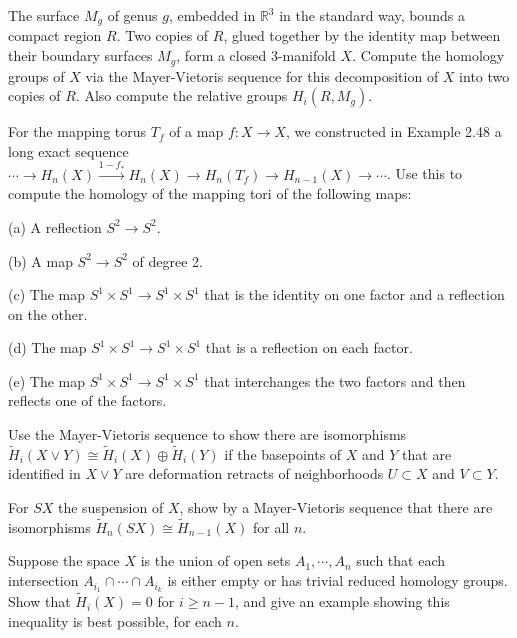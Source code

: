 \begin{exercise}
The surface $M_g$ of genus $g$, embedded in $\mathbb{R}^3$ in the standard way, bounds a compact region $R$. Two copies of $R$, glued together by the identity map between their boundary surfaces $M_g$, form a closed 3-manifold $X$. Compute the homology groups of $X$ via the Mayer-Vietoris sequence for this decomposition of $X$ into two copies of $R$. Also compute the relative groups $H_i(R, M_g)$.
\end{exercise}

\begin{exercise}
For the mapping torus $T_f$ of a map $f: X \to X$, we constructed in Example 2.48 a long exact sequence $\cdots \to H_n(X) \xrightarrow{1-f_*} H_n(X) \to H_n(T_f) \to H_{n-1}(X) \to \cdots$. Use this to compute the homology of the mapping tori of the following maps:

(a) A reflection $S^2 \to S^2$.

(b) A map $S^2 \to S^2$ of degree 2.

(c) The map $S^1 \times S^1 \to S^1 \times S^1$ that is the identity on one factor and a reflection on the other.

(d) The map $S^1 \times S^1 \to S^1 \times S^1$ that is a reflection on each factor.

(e) The map $S^1 \times S^1 \to S^1 \times S^1$ that interchanges the two factors and then reflects one of the factors.
\end{exercise}

\begin{exercise}
Use the Mayer-Vietoris sequence to show there are isomorphisms $\tilde{H}_i(X \vee Y) \cong \tilde{H}_i(X) \oplus \tilde{H}_i(Y)$ if the basepoints of $X$ and $Y$ that are identified in $X \vee Y$ are deformation retracts of neighborhoods $U \subset X$ and $V \subset Y$.
\end{exercise}

\begin{exercise}
For $SX$ the suspension of $X$, show by a Mayer-Vietoris sequence that there are isomorphisms $\tilde{H}_n(SX) \cong \tilde{H}_{n-1}(X)$ for all $n$.
\end{exercise}

\begin{exercise}
Suppose the space $X$ is the union of open sets $A_1, \cdots, A_n$ such that each intersection $A_{i_1} \cap \cdots \cap A_{i_k}$ is either empty or has trivial reduced homology groups. Show that $\tilde{H}_i(X) = 0$ for $i \geq n - 1$, and give an example showing this inequality is best possible, for each $n$.
\end{exercise}

